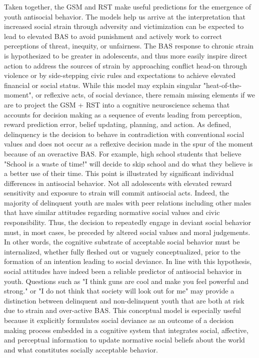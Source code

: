 \documentclass[utf8]{article}
\begin{document}
Taken together, the GSM and RST make useful predictions for the emergence of youth antisocial behavior. The models help us arrive at the interpretation that increased social strain through adversity and victimization can be expected to lead to elevated BAS to avoid punishment and actively work to correct perceptions of threat, inequity, or unfairness. The BAS response to chronic strain is hypothesized to be greater in adolescents, and thus more easily inspire direct action to address the sources of strain by approaching conflict head-on through violence or by side-stepping civic rules and expectations to achieve elevated financial or social status. While this model may explain singular  "heat-of-the-moment", or reflexive acts, of social deviance, there remain missing elements if we are to project the GSM + RST into a cognitive neuroscience schema that accounts for decision making as a sequence of events leading from perception, reward prediction error, belief updating, planning, and action. As defined, delinquency is the decision to behave in contradiction with conventional social values and does not occur as a reflexive decision made in the spur of the moment because of an overactive BAS. For example, high school students that believe "School is a waste of time!" will decide to skip school and do what they believe is a better use of their time. This point is illustrated by significant individual differences in antisocial behavior. Not all adolescents with elevated reward sensitivity and exposure to strain will commit antisocial acts. Indeed, the majority of delinquent youth are males with peer relations including other males that have similar attitudes regarding normative social values and civic responsibility. Thus, the decision to repeatedly engage in deviant social behavior must, in most cases, be preceded by altered social values and moral judgements. In other words, the cognitive substrate of acceptable social behavior must be internalized, whether fully fleshed out or vaguely conceptualized, prior to the formation of an intention leading to social deviance. In line with this hypothesis, social attitudes have indeed been a reliable predictor of antisocial behavior in youth. Questions such as "I think guns are cool and make you feel powerful and strong." or "I do not think that society will look out for me" may provide a distinction between delinquent and non-delinquent youth that are both at risk due to strain and over-active BAS. This conceptual model is especially useful because it explicitly formulates social deviance as an outcome of a decision making process embedded in a cognitive system that integrates social, affective, and perceptual information to update normative social beliefs about the world and what constitutes socially acceptable behavior.
\end{document}
